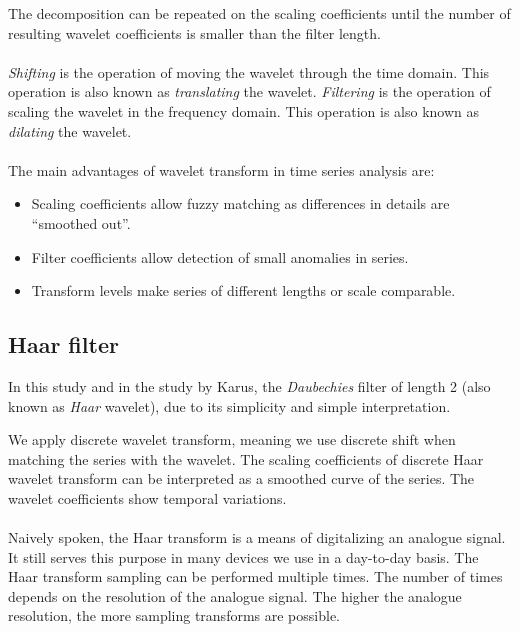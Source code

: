 The decomposition can be repeated on the scaling coefficients until the number
of resulting wavelet coefficients is smaller than the filter length.

\paragraph{}
\emph{Shifting }\rm is the operation of moving the wavelet through the time
domain. This operation is also known as \emph{translating }\rm the wavelet.
\emph{Filtering }\rm is the operation of scaling the wavelet in the frequency
domain. This operation is also known as \emph{dilating }\rm the wavelet.

\paragraph{}
The main advantages of wavelet transform in time series analysis are:
\begin{itemize}
	\item Scaling coefficients allow fuzzy matching as differences in details are
	``smoothed out''.
	\item Filter coefficients allow detection of small anomalies in series.
	\item Transform levels make series of different lengths or scale comparable.
\end{itemize}

\subsection{Haar filter}
In this study and in the study by Karus, the \emph{Daubechies }\rm filter of
length 2 (also known as \emph{Haar }\rm wavelet), due to its simplicity and
simple interpretation.

We apply discrete wavelet transform, meaning we use discrete shift when matching
the series with the wavelet. The scaling coefficients of discrete Haar wavelet
transform can be interpreted as a smoothed curve of the series. The wavelet
coefficients show temporal variations.

\paragraph{}
Naively spoken, the Haar transform is a means of digitalizing an analogue
signal. It still serves this purpose in many devices we use in a day-to-day
basis. The Haar transform sampling can be performed multiple times. The number
of times depends on the resolution of the analogue signal. The higher the
analogue resolution, the more sampling transforms are possible.\\

